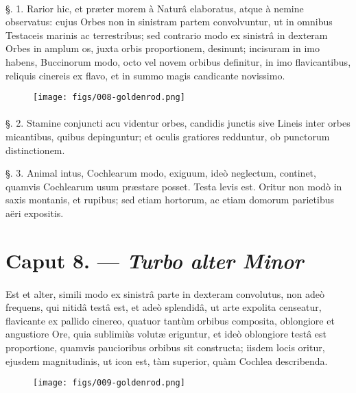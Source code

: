 \documentclass[a4paper, 11pt, oneside, polutonikogreek, german]{article}
\begin{document}
\paragraph{}
§. 1. Rarior hic, et præter morem à Naturâ elaboratus, atque à nemine observatus: cujus Orbes non in sinistram partem convolvuntur, ut in omnibus Testaceis marinis ac terrestribus; sed contrario modo ex sinistrâ in dexteram Orbes in amplum os, juxta orbis proportionem, desinunt; incisuram in imo habens, Buccinorum modo, octo vel novem orbibus definitur, in imo flavicantibus, reliquis cinereis ex flavo, et in summo magis candicante novissimo.

\begin{figure}[H]
\centering
\texttt{[image: figs/008-goldenrod.png]}

\end{figure}
\paragraph{}
§. 2. Stamine conjuncti acu videntur orbes, candidis junctis sive Lineis inter orbes micantibus, quibus depinguntur; et oculis gratiores redduntur, ob punctorum distinctionem.

§. 3. Animal intus, Cochlearum modo, exiguum, ideò neglectum, continet, quamvis Cochlearum usum præstare posset. Testa levis est. Oritur non modò in saxis montanis, et rupibus; sed etiam hortorum, ac etiam domorum parietibus aëri expositis.

\section{Caput 8. --- \emph{Turbo alter Minor}}
\paragraph{}
Est et alter, simili modo ex sinistrâ parte in dexteram convolutus, non adeò frequens, qui nitidâ testâ est, et adeò splendidâ, ut arte expolita censeatur, flavicante ex pallido cinereo, quatuor tantùm orbibus composita, oblongiore et angustiore Ore, quia sublimiùs volutæ eriguntur, et ideò oblongiore testâ est proportione, quamvis paucioribus orbibus sit constructa; iisdem locis oritur, ejusdem magnitudinis, ut icon est, tàm superior, quàm Cochlea describenda.

\begin{figure}[H]
\centering
\texttt{[image: figs/009-goldenrod.png]}

\end{figure}
\end{document}

